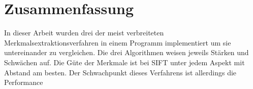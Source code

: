 \chapter{Zusammenfassung}

In dieser Arbeit wurden drei der meist verbreiteten Merkmalsextraktionsverfahren in einem Programm implementiert um sie untereinander zu vergleichen.
Die drei Algorithmen weisen jeweils Stärken und Schwächen auf.
Die Güte der Merkmale ist bei SIFT unter jedem Aspekt mit Abstand am besten.
Der Schwachpunkt dieses Verfahrens ist allerdings die Performance 